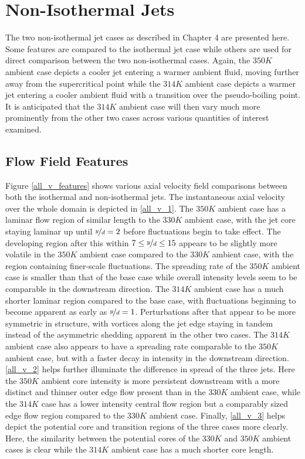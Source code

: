 \section{Non-Isothermal Jets}
The two non-isothermal jet cases as described in Chapter 4 are presented here. Some features are compared to the isothermal jet case while others are used for direct comparison between the two non-isothermal cases. Again, the $350 K$ ambient case depicts a cooler jet entering a warmer ambient fluid, moving further away from the supercritical point while the $314 K$ ambient case depicts a warmer jet entering a cooler ambient fluid with a transition over the pseudo-boiling point. It is anticipated that the $314 K$ ambient case will then vary much more prominently from the other two cases across various quantities of interest examined. 
\subsection{Flow Field Features}
Figure \ref{all_v_features} shows various axial velocity field comparisons between both the isothermal and non-isothermal jets. The instantaneous axial velocity over the whole domain is depicted in \ref{all_v_1}. The $350 K$ ambient case has a laminar flow region of similar length to the $330 K $ ambient case, with the jet core staying laminar up until $\nicefrac{y}{d} = 2$ before fluctuations begin to take effect. The developing region after this within $7 \leq \nicefrac{y}{d} \leq 15$ appears to be slightly more volatile in the $350 K$ ambient case compared to the $330 K$ ambient case, with the region containing finer-scale fluctuations. The spreading rate of the $350 K$ ambient case is smaller than that of the base case while overall intensity levels seem to be comparable in the downstream direction. The $314 K$ ambient case has a much shorter laminar region compared to the base case, with fluctuations beginning to become apparent as early as $\nicefrac{y}{d} = 1$. Perturbations after that appear to be more symmetric in structure, with vortices along the jet edge staying in tandem instead of the asymmetric shedding apparent in the other two cases. The $314 K$ ambient case also appears to have a spreading rate comparable to the $350 K$ ambient case, but with a faster decay in intensity in the downstream direction. \ref{all_v_2} helps further illuminate the difference in spread of the three jets. Here the $350 K$ ambient core intensity is more persistent downstream with a more distinct and thinner outer edge flow present than in the $330 K$ ambient case, while the $314 K$ case has a lower intensity central flow region but a comparably sized edge flow region compared to the $330 K$ ambient case. Finally, \ref{all_v_3} helps depict the potential core and transition regions of the three cases more clearly. Here, the similarity between the potential cores of the $330 K$ and $350 K$ ambient cases is clear while the $314 K$ ambient case has a much shorter core length. 

